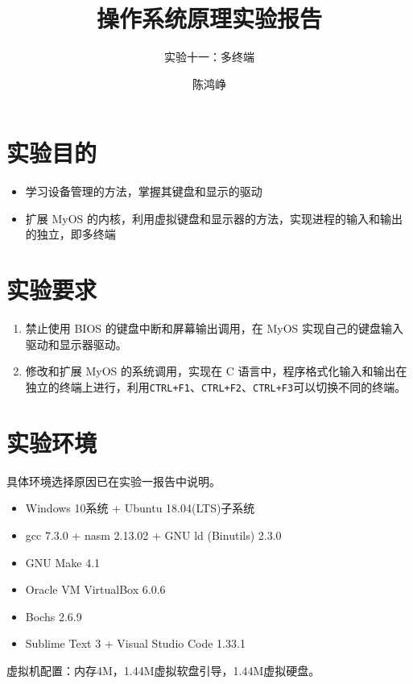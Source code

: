 \documentclass[logo,reportComp]{thesis}
\title{操作系统原理实验报告}
\subtitle{实验十一：多终端}
\author{陈鸿峥}
\begin{document}
\maketitle

\section{实验目的}
\begin{itemize}
	\item 学习设备管理的方法，掌握其键盘和显示的驱动
	\item 扩展 MyOS 的内核，利用虚拟键盘和显示器的方法，实现进程的输入和输出的独立，即多终端
\end{itemize}

\section{实验要求}
\begin{enumerate}
	\item 禁止使用 BIOS 的键盘中断和屏幕输出调用，在 MyOS 实现自己的键盘输入驱动和显示器驱动。
	\item 修改和扩展 MyOS 的系统调用，实现在 C 语言中，程序格式化输入和输出在独立的终端上进行，利用\verb'CTRL+F1'、\verb'CTRL+F2'、\verb'CTRL+F3'可以切换不同的终端。
\end{enumerate}

\section{实验环境}
具体环境选择原因已在实验一报告中说明。
\begin{itemize}
	\item Windows 10系统 + Ubuntu 18.04(LTS)子系统
	\item gcc 7.3.0 + nasm 2.13.02 + GNU ld (Binutils) 2.3.0
	\item GNU Make 4.1
	\item Oracle VM VirtualBox 6.0.6
	\item Bochs 2.6.9
	\item Sublime Text 3 + Visual Studio Code 1.33.1
\end{itemize}

虚拟机配置：内存4M，1.44M虚拟软盘引导，1.44M虚拟硬盘。
\end{document}
